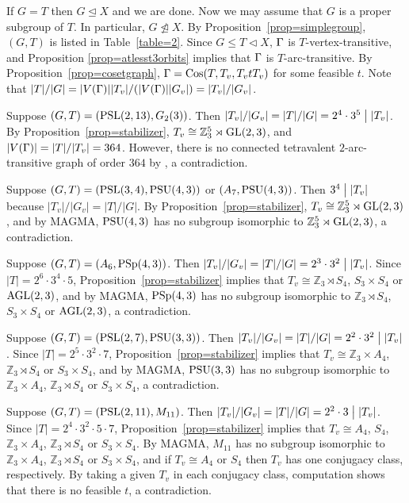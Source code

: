 \documentclass[12pt]{article}
\def\di{\bigm|} \def\lg{\langle} \def\rg{\rangle}
\def\PSL{\hbox{\rm PSL}}\def\PSU{\hbox{\rm PSU}}
\def\PSp{\hbox{\rm PSp}}\def\P\GammaL{\hbox{\rm P\Gamma L}} \def\ASIL{\hbox{\rm A\Sigma L}}
\def\Cos{\hbox{\rm Cos}}
\def\mz{{\mathbb Z}}
\begin{document}
If $G=T$ then $G\unlhd X$ and we are done. Now we may assume  that $G$ is a proper subgroup of $T$. In particular, $G\ntrianglelefteq X$.
By Proposition~\ref{prop=simplegroup}, $(G,T)$ is listed in Table~\ref{table=2}. Since $G\leq T\lhd X$, $\Gamma$ is $T$-vertex-transitive, and Proposition \ref{prop=atlesst3orbits} implies that $\Gamma$ is $T$-arc-transitive. By Proposition~\ref{prop=cosetgraph}, $\G=\Cos(T,T_v,T_vtT_v)$ for some feasible $t$.
Note that $|T|/|G|=|V(\Gamma)||T_v|/(|V(\Gamma)||G_v|)=|T_v|/|G_v|$.

Suppose $(G,T)=(\PSL(2,13),G_2(3))$. Then $|T_v|/|G_v|=|T|/|G|=2^4\cdot3^5\di |T_v|$. By Proposition~\ref{prop=stabilizer}, $T_v\cong \mz_3^5\rtimes \GL(2,3)$, and $|V(\Gamma)|=|T|/|T_v|=364$. However, there is no connected tetravalent $2$-arc-transitive graph of order $364$ by \cite[Table 2]{Potocnik}, a contradiction.

Suppose $(G,T)=(\PSL(3,4),\PSU(4,3))$ or $(A_7,\PSU(4,3))$. Then  $3^4\di |T_v|$ because $|T_v|/|G_v|=|T|/|G|$. By Proposition~\ref{prop=stabilizer}, $T_v\cong \mz_3^5\rtimes \GL(2,3)$, and by MAGMA, $\PSU(4,3)$ has no subgroup isomorphic to $\mz_3^5\rtimes \GL(2,3)$, a contradiction.

Suppose $(G,T)=(A_6,\PSp(4,3))$. Then $|T_v|/|G_v|=|T|/|G|=2^3 \cdot 3^2\di |T_v|$. Since $|T|=2^6 \cdot 3^4 \cdot5$, Proposition~\ref{prop=stabilizer} implies that $T_v\cong \mz_3\rtimes S_4$, $S_3 \times S_4$ or $\rm AGL(2,3)$, and by MAGMA, $\PSp(4,3)$ has no subgroup isomorphic to $\mz_3\rtimes S_4$, $S_3 \times S_4$ or $\rm AGL(2,3)$, a contradiction.

Suppose $(G,T)=(\PSL(2,7),\PSU(3,3))$. Then $|T_v|/|G_v|=|T|/|G|=2^2 \cdot 3^2\di |T_v|$. Since $|T|=2^5 \cdot 3^2 \cdot7$, Proposition~\ref{prop=stabilizer} implies that $T_v\cong \mz_3\times A_4$, $\mz_3\rtimes S_4$ or $S_3 \times S_4$, and by MAGMA, $\PSU(3,3)$ has no subgroup isomorphic to $\mz_3\times A_4$, $\mz_3\rtimes S_4$ or $S_3 \times S_4$, a contradiction.

Suppose $(G,T)=(\PSL(2,11),M_{11})$. Then $|T_v|/|G_v|=|T|/|G|= 2^2\cdot 3\di |T_v|$. Since $|T|=2^4\cdot 3^2\cdot 5\cdot 7$,  Proposition~\ref{prop=stabilizer} implies that $T_v\cong A_4 $, $S_4$, $\mz_3\times A_4$, $\mz_3\rtimes S_4$ or $S_3\times S_4$. By MAGMA, $M_{11}$ has no subgroup isomorphic to $\mz_3\times A_4$, $\mz_3\rtimes S_4$ or $S_3\times S_4$, and if $T_v\cong A_4 $ or $S_4$ then $T_v$ has one conjugacy class, respectively. By taking a given $T_v$ in each conjugacy class, computation shows that there is no feasible $t$, a contradiction.
\end{document}
